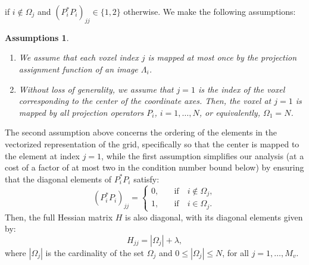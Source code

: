 \documentclass{article}
\newtheorem{assumptions}[theorem]{Assumptions}%
\begin{document}
if $i \notin \Omega_j$ and $(P_i^* P_i)_{jj} \in \{1, 2\}$ otherwise. 
We make the following assumptions: 
\begin{assumptions}\label{assump:projections}
\begin{enumerate}
    \item We assume that each voxel index $j$ is mapped at most once by the projection
        assignment function of an image $\Lambda_i$.
    \item Without loss of generality, we assume that $j=1$ is the index of the 
        voxel corresponding to the center of the coordinate axes. 
        Then, the voxel at $j=1$ is mapped by all projection operators $P_i$,
        $i=1,\ldots,N$, or equivalently, $\Omega_1 = N$.
\end{enumerate}
\end{assumptions}
The second assumption above concerns the ordering of the elements in the vectorized 
representation of the grid, specifically so that the center is mapped to the element 
at index $j=1$, while the first assumption simplifies our analysis (at a cost of
a factor of at most two in the condition number bound below) by ensuring that 
the diagonal elements of $P_i^* P_i$ satisfy:
\begin{equation}
    (P_i^* P_i)_{jj} = \begin{cases}
        0, &\quad\text{if}\quad i \notin \Omega_j,
        \\
        1, &\quad\text{if}\quad i \in \Omega_j.
    \end{cases}
    \label{eq:pp}
\end{equation}
Then, the full Hessian matrix $H$ is also diagonal, with its diagonal elements given by:
\begin{equation}
    H_{jj} = |\Omega_j| + \lambda,
    \label{eq:H diag}
\end{equation}
where $|\Omega_j|$ is the cardinality of the set $\Omega_j$ 
and $0 \leq |\Omega_j| \leq N$, for all $j=1,\ldots,M_v$.
\end{document}
